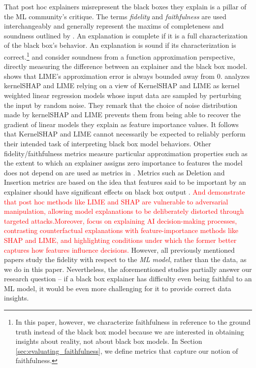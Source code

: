 \documentclass[mnsc,blindrev]{informs3}
\begin{document}
    
        That post hoc explainers misrepresent the black boxes they explain is a pillar of the ML community's critique. The terms \emph{fidelity} and \emph{faithfulness} are used interchangeably and generally represent the maxims of completeness and soundness outlined by \cite{zhou21evaluating}. An explanation is complete if it is a full characterization of the black box's behavior. An explanation is sound if its characterization is correct.\footnote{In this paper, however, we characterize faithfulness in reference to the ground truth instead of the black box model because we are interested in obtaining insights about reality, not about black box models. In Section \ref{sec:evaluating_faithfulness}, we define metrics that capture our notion of faithfulness.} 
    \cite{garreau2020looking} and \cite{han22which} consider soundness from a function approximation perspective, directly measuring the difference between an explainer  and the black box model. \cite{garreau2020looking} shows that LIME's approximation error is always bounded away from 0. \cite{han22which} analyzes kernelSHAP and LIME relying on a view of KernelSHAP and LIME as kernel weighted linear regression models whose input data are sampled by perturbing the input by random noise. They remark that the choice of noise distribution made by kernelSHAP and LIME prevents them from being able to recover the gradient of linear models they explain as feature importance values. It follows that KernelSHAP and LIME cannot necessarily be expected to reliably perform their intended task of interpreting black box model behaviors. 
Other fidelity/faithfulness metrics measure particular approximation properties such as the extent to which an explainer assigns zero importance to features the model does not depend on are used as metrics in \cite{nguyen2020quantitative}. Metrics such as Deletion and Insertion metrics are based on the idea that features said to be important by an explainer should have significant effects on black box output \citep{deyoung20eraser,nguyen2020quantitative,alvarez18robustness,luss2021leveraging}. \textcolor{red}{And \citet{slack19fooling} demonstrate that post hoc methods like LIME and SHAP are vulnerable to adversarial manipulation, allowing model explanations to be deliberately distorted through targeted attacks.Moreover, \citet{fernandez20explaining} focus on explaining AI decision-making processes, contrasting counterfactual explanations with feature-importance methods like SHAP and LIME, and highlighting conditions under which the former better captures how features influence decisions.} However, all previously mentioned papers study the fidelity with respect to the \textit{ML model}, rather than the data, as we do in this paper. Nevertheless, the aforementioned studies partially answer our research question -- if a black box explainer has difficulty even being faithful to an ML model, it would be even more challenging for it to provide correct data insights.
\end{document}
